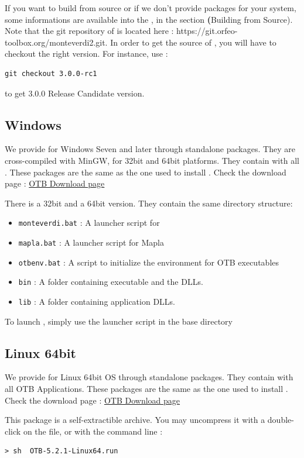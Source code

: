 If you want to build from source or if we don't provide packages for your system, some informations are available into the \sg, in the section \textbf(Building from Source).
Note that the git repository of \mont is located here : https://git.orfeo-toolbox.org/monteverdi2.git.
In order to get the source of \mont, you will have to checkout the right version. For instance, use : 
\begin{verbatim}
git checkout 3.0.0-rc1
\end{verbatim}
to get 3.0.0 Release Candidate version.

\subsection{Windows}
We provide \mont for Windows Seven and later through standalone packages.
They are cross-compiled with MinGW, for 32bit and 64bit platforms.
They contain \mont with all \app. These packages are the same as the one used 
to install \app. Check the download page :
\href{https://www.orfeo-toolbox.org/download}{OTB Download page}

There is a 32bit and a 64bit version. They contain the same directory structure:
\begin{itemize}
\item \verb?monteverdi.bat? : A launcher script for \mont
\item \verb?mapla.bat? : A launcher script for Mapla
\item \verb?otbenv.bat? : A script to initialize the environment for OTB executables
\item \verb?bin? : A folder containing \mont executable and the DLLs.
\item \verb?lib? : A folder containing application DLLs.
\end{itemize}

To launch \mont, simply use the launcher script in the base directory

\subsection{Linux 64bit}

We provide \mont for Linux 64bit OS through standalone packages.
They contain \mont with all OTB Applications. These packages are the same as 
the one used to install \app. Check the download page :
\href{https://www.orfeo-toolbox.org/download}{OTB Download page}

This package is a self-extractible archive. You may uncompress it with a
double-click on the file, or with the command line :
\begin{verbatim}
> sh  OTB-5.2.1-Linux64.run
\end{verbatim}

